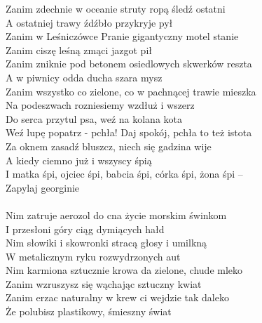 \documentclass[a5paper, 10pt]{book}
\begin{document}
\begin{minipage}[t]{0.8\textwidth}
Zanim zdechnie w oceanie struty ropą śledź ostatni\\
A ostatniej trawy źdźbło przykryje pył\\
Zanim w Leśniczówce Pranie gigantyczny motel stanie\\
Zanim ciszę leśną zmąci jazgot pił\\

Zanim zniknie pod betonem osiedlowych skwerków reszta\\
A w piwnicy odda ducha szara mysz\\
Zanim wszystko co zielone, co w pachnącej trawie mieszka\\
Na podeszwach rozniesiemy wzdłuż i wszerz\\

\hspace*{5mm}Do serca przytul psa, weź na kolana kota\\
\hspace*{5mm}Weź lupę popatrz - pchła! Daj spokój, pchła to też istota\\
\hspace*{5mm}Za oknem zasadź bluszcz, niech się gadzina wije\\
\hspace*{5mm}A kiedy ciemno już i wszyscy śpią\\
\hspace*{5mm}I matka śpi, ojciec śpi, babcia śpi, córka śpi, żona śpi –\\
\hspace*{5mm}Zapylaj georginie\\
\vspace*{10mm}\\
Nim zatruje aerozol do cna życie morskim świnkom\\
I przesłoni góry ciąg dymiących hałd\\
Nim słowiki i skowronki stracą głosy i umilkną\\
W metalicznym ryku rozwydrzonych aut\\

Nim karmiona sztucznie krowa da zielone, chude mleko\\
Zanim wzruszysz się wąchając sztuczny kwiat\\
Zanim erzac naturalny w krew ci wejdzie tak daleko\\
Że polubisz plastikowy, śmieszny świat\\


\end{minipage}
\end{document}
